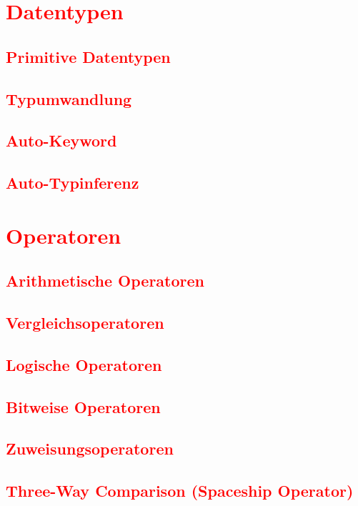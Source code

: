 \section{\textcolor{red}{Datentypen}}\label{sec:datatypes}
\subsection{\textcolor{red}{Primitive Datentypen}}\label{sec:primitive-datatypes}
\subsection{\textcolor{red}{Typumwandlung}}\label{sec:type-conversion}
\subsection{\textcolor{red}{Auto-Keyword}}\label{sec:auto-keyword}
\subsection{\textcolor{red}{Auto-Typinferenz}}\label{sec:auto-type-inference}
\section{\textcolor{red}{Operatoren}}\label{sec:operators}
\subsection{\textcolor{red}{Arithmetische Operatoren}}\label{sec:arithmetic-operators}
\subsection{\textcolor{red}{Vergleichsoperatoren}}\label{sec:comparison-operators}
\subsection{\textcolor{red}{Logische Operatoren}}\label{sec:logical-operators}
\subsection{\textcolor{red}{Bitweise Operatoren}}\label{sec:bitwise-operators}
\subsection{\textcolor{red}{Zuweisungsoperatoren}}\label{sec:assignment-operators}
\subsection{\textcolor{red}{Three-Way Comparison (Spaceship Operator)}}\label{sec:spaceship-operator}
